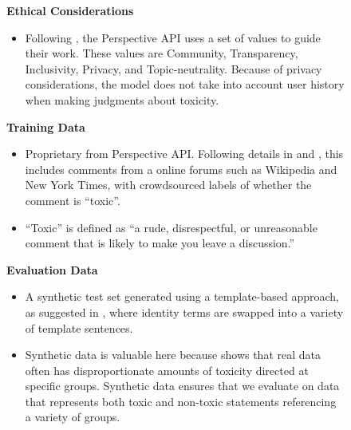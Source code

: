 \begin{figure}
\begin{framed}
\begin{minipage}{.45\textwidth}
{\bf Ethical Considerations}
\begin{itemize}[leftmargin=*]
\item Following \cite{conversation_ai}, the Perspective API uses a set of values to guide their work. These values are Community, Transparency, Inclusivity, Privacy, and Topic-neutrality. Because of privacy considerations, the model does not take into account user history when making judgments about toxicity.
\end{itemize}
\vspace{1em}
 \end{minipage}
 \hspace{2em}
     \begin{minipage}{.45\textwidth}
\vspace{2em}
{\bf Training Data} 
\begin{itemize}[leftmargin=*]
\item Proprietary from Perspective API.  Following details in \cite{DixonEtAl2018} and \cite{perspective_api}, this includes comments from a online forums such as Wikipedia and New York Times, with crowdsourced labels of whether the comment is ``toxic''.
\item ``Toxic'' is defined as ``a rude, disrespectful, or unreasonable comment that is likely to make you leave a discussion.''
\end{itemize}

{\bf Evaluation Data} 
\begin{itemize}[leftmargin=*]
\item A synthetic test set generated using a template-based approach, as suggested in \cite{DixonEtAl2018}, where identity terms are swapped into a variety of template sentences.
\item Synthetic data is valuable here because \cite{DixonEtAl2018} shows that real data often has disproportionate amounts of toxicity directed at specific groups. Synthetic data ensures that we evaluate on data that represents both toxic and non-toxic statements referencing a variety of groups. 
\end{itemize}


\end{minipage}
\end{framed}
\end{figure}

